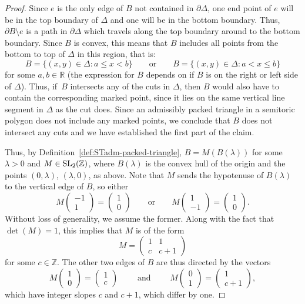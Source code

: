 \documentclass[pdftex]{sigma}
\numberwithin{equation}{section}
\def\R{{\mathbb R}}
\def\Z{{\mathbb Z}}
\newcommand{\De}{\Delta}
\newcommand{\SL}{{\rm SL}_2(\Z)}
\newcommand{\vectbig}[2]{\begin{pmatrix} #1 \\ #2 \end{pmatrix}}
\begin{document}
\begin{proof}
Since $e$ is the only edge of $B$ not contained in $\partial \De$, one end point of $e$ will be in the top boundary of $\De$ and one will be in the bottom boundary. Thus, $\partial B \setminus e$ is a path in $\partial \De$ which travels along the top boundary around to the bottom boundary. Since $B$ is convex, this means that $B$ includes all points from the bottom to top of $\De$ in this region, that is:
\[B = \{(x,y)\in\De\colon a \leq x < b\} \qquad \text{or} \qquad B = \{(x,y)\in\De\colon a < x \leq b\}\]
for some $a,b\in\R$ (the expression for $B$ depends on if $B$ is on the right or left side of $\De$).
Thus, if~$B$ intersects any of the cuts in $\De$, then $B$ would also have to contain the corresponding marked point, since it lies on the same vertical line segment in $\De$ as the cut does. Since an admissibly packed triangle in a semitoric polygon does not include any marked points, we conclude that $B$ does not intersect any cuts and we have established the first part of the claim.

Thus, by Definition~\ref{def:STadm-packed-triangle},
$B = M(B(\lambda))$ for some $\lambda>0$ and $M\in\SL$, where $B(\lambda)$ is the convex hull of the origin and the points $(0,\lambda)$, $(\lambda, 0)$, as above.
Note that $M$ sends the hypotenuse of $B(\lambda)$ to the vertical edge of $B$, so either
\[
 M \vectbig{-1}{1} = \vectbig{1}{0} \qquad \text{or}\qquad M \vectbig{1}{-1} = \vectbig{1}{0}.
\]
Without loss of generality, we assume the former.
Along with the fact that $\det(M) = 1$, this implies that $M$ is of the form
\[
M = \begin{pmatrix} 1 & 1\\ c & c+1\end{pmatrix}
\]
for some $c\in \Z$.
The other two edges of $B$ are thus directed by the vectors
\[
M \vectbig{1}{0} = \vectbig{1}{c} \qquad\text{ and }\qquad M \vectbig{0}{1} = \vectbig{1}{c+1},
\]
which have integer slopes $c$ and $c+1$, which differ by one.
\end{proof}
\end{document}
